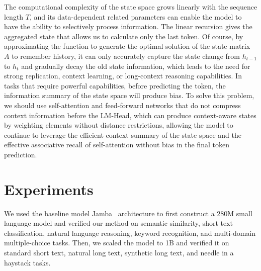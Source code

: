 \documentclass{article}
\theoremstyle{plain}
\theoremstyle{definition}
\theoremstyle{remark}
\begin{document}
The computational complexity of the state space grows linearly with the sequence length $T$, and its data-dependent related parameters can enable the model to have the ability to selectively process information. The linear recursion gives the aggregated state that allows us to calculate only the last token. Of course, by approximating the function to generate the optimal solution of the state matrix $A$ to remember history, it can only accurately capture the state change from $h_{t-1}$ to $h_t$ and gradually decay the old state information, which leads to the need for strong replication, context learning, or long-context reasoning capabilities. In tasks that require powerful capabilities, before predicting the token, the information summary of the state space will produce bias. To solve this problem, we should use self-attention and feed-forward networks that do not compress context information before the LM-Head, which can produce context-aware states by weighting elements without distance restrictions, allowing the model to continue to leverage the efficient context summary of the state space and the effective associative recall of self-attention without bias in the final token prediction.


\section{Experiments}

We used the baseline model Jamba~\cite{lieber2024jamba} architecture to first construct a 280M small language model and verified our method on semantic similarity, short text classification, natural language reasoning, keyword recognition, and multi-domain multiple-choice tasks. Then, we scaled the model to 1B and verified it on standard short text, natural long text, synthetic long text, and needle in a haystack tasks.
\end{document}
